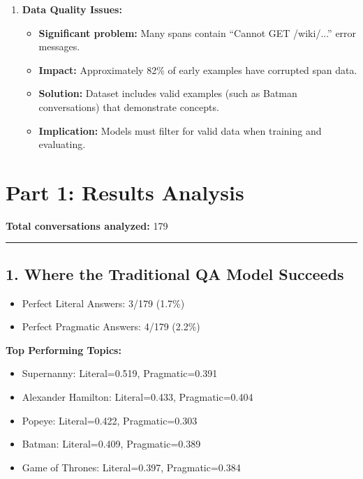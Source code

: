 \documentclass[12pt, letterpaper]{article}
\begin{document}
\begin{enumerate}
    \item \textbf{Data Quality Issues:}
    \begin{itemize}
        \item \textbf{Significant problem:} Many spans contain ``Cannot GET /wiki/...'' error messages.
        \item \textbf{Impact:} Approximately 82\% of early examples have corrupted span data.
        \item \textbf{Solution:} Dataset includes valid examples (such as Batman conversations) that demonstrate concepts.
        \item \textbf{Implication:} Models must filter for valid data when training and evaluating.
    \end{itemize}
\end{enumerate}

\clearpage
\section*{Part 1: Results Analysis}
\label{part1}
{}




\noindent \textbf{Total conversations analyzed:} 179

\bigskip
\hrule
\subsection*{1. Where the Traditional QA Model Succeeds}
{}


\begin{itemize}
    \item Perfect Literal Answers: 3/179 (1.7\%)
    \item Perfect Pragmatic Answers: 4/179 (2.2\%)
\end{itemize}

\noindent \textbf{Top Performing Topics:}
\begin{itemize}
    \item Supernanny: Literal=0.519, Pragmatic=0.391
    \item Alexander Hamilton: Literal=0.433, Pragmatic=0.404
    \item Popeye: Literal=0.422, Pragmatic=0.303
    \item Batman: Literal=0.409, Pragmatic=0.389
    \item Game of Thrones: Literal=0.397, Pragmatic=0.384
\end{itemize}
\end{document}
